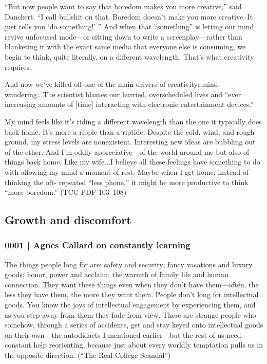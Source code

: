 			``But now people want to say that boredom makes you more creative,'' said Danckert. ``I call bullshit on that. Boredom doesn't make you more creative. It just tells you ‘do something!' '' And when that ``something'' is letting our mind revive unfocused mode---or sitting down to write a screenplay---rather than blanketing it with the exact same media that everyone else is consuming, we begin to think, quite literally, on a different wavelength. That's what creativity requires. 

			And now we've killed off one of the main drivers of creativity: mind- wandering...The scientist blames our hurried, overscheduled lives and ``ever increasing amounts of [time] interacting with electronic entertainment devices.'' 

			My mind feels like it's riding a different wavelength than the one it typically does back home. It's more a ripple than a riptide. Despite the cold, wind, and rough ground, my stress levels are nonexistent. Interesting new ideas are bubbling out of the ether. And I'm oddly appreciative---of the world around me but also of things back home. Like my wife...I believe all these feelings have something to do with allowing my mind a moment of rest. Maybe when I get home, instead of thinking the oft- repeated ``less phone,'' it might be more productive to think ``more boredom.'' (TCC PDF 103--108)
			
	\subsection{Growth and discomfort} %
		\label{GM-LIFE-GROWTH}
		
		\subsubsection{0001 | Agnes Callard on constantly learning}
			\label{GM-LIFE-GROWTH-0001}
			
			The things people long for are: safety and security; fancy vacations and luxury goods; honor, power and acclaim; the warmth of family life and human connection. They want these things even when they don't have them---often, the less they have them, the more they want them. People don't long for intellectual goods. You know the joys of intellectual engagement by experiencing them, and as you step away from them they fade from view. There are strange people who somehow, through a series of accidents, get and stay keyed onto intellectual goods on their own---the autodidacts I mentioned earlier---but the rest of us need constant help reorienting, because just about every worldly temptation pulls us in the opposite direction. (``The Real College Scandal'')
		
